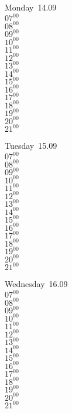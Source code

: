 \documentclass[11pt,a4paper]{book}\usepackage[]{graphicx}\usepackage[]{color}
\begin{document}
\begin{headerbox}
\end{headerbox}
\begin{weekdaybox}
  Monday~14.09\\
  { 
  \vfill
  $07^{00}$\\
$08^{00}$\\
$09^{00}$\\
$10^{00}$\\
$11^{00}$\\
$12^{00}$\\
$13^{00}$\\
$14^{00}$\\
$15^{00}$\\
$16^{00}$\\
$17^{00}$\\
$18^{00}$\\
$19^{00}$\\
$20^{00}$\\
$21^{00}$\\
  }
\end{weekdaybox}
\begin{weekdaybox}
  Tuesday~15.09\\
  { 
  \vfill
  $07^{00}$\\
$08^{00}$\\
$09^{00}$\\
$10^{00}$\\
$11^{00}$\\
$12^{00}$\\
$13^{00}$\\
$14^{00}$\\
$15^{00}$\\
$16^{00}$\\
$17^{00}$\\
$18^{00}$\\
$19^{00}$\\
$20^{00}$\\
$21^{00}$\\
  }
\end{weekdaybox}
\begin{weekdaybox}
  Wednesday~16.09\\
  { 
  \vfill
  $07^{00}$\\
$08^{00}$\\
$09^{00}$\\
$10^{00}$\\
$11^{00}$\\
$12^{00}$\\
$13^{00}$\\
$14^{00}$\\
$15^{00}$\\
$16^{00}$\\
$17^{00}$\\
$18^{00}$\\
$19^{00}$\\
$20^{00}$\\
$21^{00}$\\
  }
\end{weekdaybox}
\end{document}
